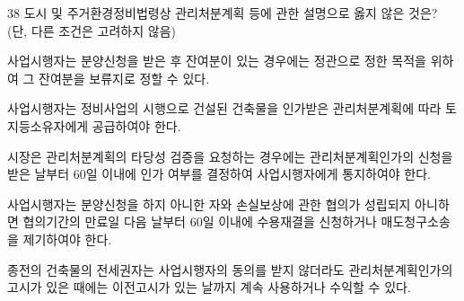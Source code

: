 \begin{question}{38}
도시 및 주거환경정비법령상 관리처분계획 등에 관한 설명으로 옳지 않은 것은? (단, 다른 조건은 고려하지 않음)
\begin{choices}
  \item 사업시행자는 분양신청을 받은 후 잔여분이 있는 경우에는 정관으로 정한 목적을 위하여 그 잔여분을 보류지로 정할 수 있다.
  \item 사업시행자는 정비사업의 시행으로 건설된 건축물을 인가받은 관리처분계획에 따라 토지등소유자에게 공급하여야 한다.
  \item 시장은 관리처분계획의 타당성 검증을 요청하는 경우에는 관리처분계획인가의 신청을 받은 날부터 60일 이내에 인가 여부를 결정하여 사업시행자에게 통지하여야 한다.
  \item 사업시행자는 분양신청을 하지 아니한 자와 손실보상에 관한 협의가 성립되지 아니하면 협의기간의 만료일 다음 날부터 60일 이내에 수용재결을 신청하거나 매도청구소송을 제기하여야 한다.
  \item 종전의 건축물의 전세권자는 사업시행자의 동의를 받지 않더라도 관리처분계획인가의 고시가 있은 때에는 이전고시가 있는 날까지 계속 사용하거나 수익할 수 있다.
\end{choices}
\end{question}
